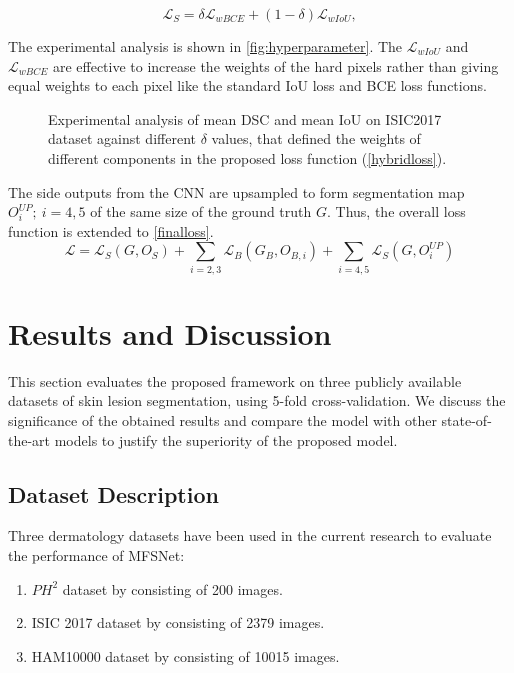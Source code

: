 \documentclass[review]{elsarticle}
\begin{document}
\begin{equation}\label{hybridloss}
    \mathcal{L}_S=\delta\mathcal{L}_{wBCE}+(1-\delta)\mathcal{L}_{wIoU},
\end{equation}

The experimental analysis is shown in \autoref{fig:hyperparameter}. The $\mathcal{L}_{wIoU}$ and $\mathcal{L}_{wBCE}$ are effective to increase the weights of the hard pixels rather than giving equal weights to each pixel like the standard IoU loss and BCE loss functions. 

\begin{figure}
    \centering
    \caption{Experimental analysis of mean DSC and mean IoU on ISIC2017 dataset against different $\delta$ values, that defined the weights of different components in the proposed loss function (\autoref{hybridloss}).}
    \label{fig:hyperparameter}
\end{figure}

The side outputs from the CNN are upsampled to form segmentation map $O^{UP}_i;\:{i=4,5}$ of the same size of the ground truth $G$. Thus, the overall loss function is extended to \autoref{finalloss}.
\begin{equation}\label{finalloss}
    \mathcal{L}=\mathcal{L}_S(G,O_S)+\sum\limits_{i=2,3}\mathcal{L}_B(G_B,O_{B,i})+\sum\limits_{i=4,5}\mathcal{L}_S(G,O_i^{UP})
\end{equation}

\section{Results and Discussion}\label{results}
This section evaluates the proposed framework on three publicly available datasets of skin lesion segmentation, using 5-fold cross-validation. We discuss the significance of the obtained results and compare the model with other state-of-the-art models to justify the superiority of the proposed model.

\subsection{Dataset Description}
Three dermatology datasets have been used in the current research to evaluate the performance of MFSNet: 
\begin{enumerate}
    \item $PH^2$ dataset by \cite{mendoncca2013ph} consisting of 200 images.
    \item ISIC 2017 dataset by \cite{codella2018skin} consisting of 2379 images.
    \item HAM10000 dataset by \cite{tschandl2018ham10000} consisting of 10015 images.
\end{enumerate}
\end{document}
